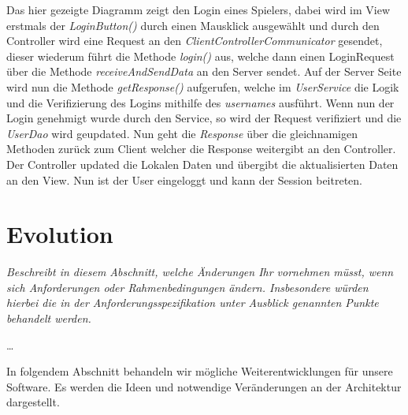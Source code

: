 \documentclass[fontsize=12pt,paper=a4,twoside]{scrartcl}
\begin{document}
Das hier gezeigte Diagramm zeigt den Login eines Spielers, dabei wird im View erstmals der \textit{LoginButton()} durch einen Mausklick ausgewählt und durch den Controller wird eine Request an den \textit{ClientControllerCommunicator} gesendet, dieser wiederum führt die Methode \textit{login()} aus, welche dann einen LoginRequest über die Methode \textit{receiveAndSendData} an den Server sendet. Auf der Server Seite wird nun die Methode \textit{getResponse()} aufgerufen, welche im \textit{UserService} die Logik und die Verifizierung des Logins mithilfe des \textit{usernames} ausführt. Wenn nun der Login genehmigt wurde durch den Service, so wird der Request verifiziert und die \textit{UserDao} wird geupdated. Nun geht die \textit{Response} über die gleichnamigen Methoden zurück zum Client welcher die Response weitergibt an den Controller. Der Controller updated die Lokalen Daten und übergibt die aktualisierten Daten an den View. Nun ist der User eingeloggt und kann der Session beitreten.


\section{Evolution} \label{sec:evolution}

{\itshape Beschreibt in diesem Abschnitt, welche Änderungen Ihr vornehmen müsst,
wenn sich Anforderungen oder Rahmenbedingungen ändern. Insbesondere würden 
hierbei die in der Anforderungsspezifikation unter \glqq{}Ausblick\grqq{} 
genannten Punkte behandelt werden.}

\dots

In folgendem Abschnitt behandeln wir mögliche Weiterentwicklungen für unsere Software. Es werden die Ideen und notwendige Veränderungen an der Architektur dargestellt.
\end{document}
